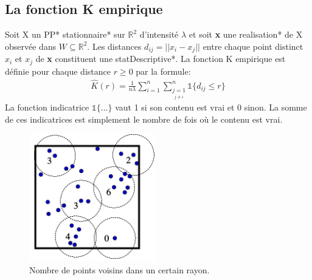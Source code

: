 \documentclass[stage2a]{tnreport}
\begin{document}
\subsection{La fonction K empirique}

Soit X un \gls{PP}* \gls{stationnaire}* sur \begin{math} \mathbb{R}^2\end{math} d'intensité \begin{math}\lambda\end{math} et soit \textbf{x} une \gls{realisation}* de X observée dans \begin{math} W \subseteq \mathbb{R}^2\end{math}. Les distances \begin{math} d_{ij} = ||x_i-x_j||\end{math} entre chaque point distinct \begin{math} x_i \end{math} et \begin{math} x_j \end{math} de \textbf{x} constituent une \gls{statDescriptive}*.
La fonction K empirique est définie pour chaque distance \begin{math} r \geq 0 \end{math} par la formule:
\begin{align*}
\hat{K}(r) = \frac{1}{n \lambda} \sum_{i=1}^n \sum_{\underset{j \neq i}{j=1}}^n \mathds{1} \{d_{ij} \leq r \}
\end{align*}
La fonction indicatrice  \begin{math} \mathds{1} \{...\}\end{math} vaut 1 si son contenu est vrai et 0 sinon. La somme de ces indicatrices est simplement le nombre de fois où le contenu est vrai.\\

\begin{figure}
\vspace{-1.2cm}
\begin{center}
\includegraphics[width=5.5cm]{figures/nombreVoisins2.png}
\caption{Nombre de points voisins dans un certain rayon.}
\label{fig:nombreVoisins}
\end{center}
\end{figure}
\end{document}
